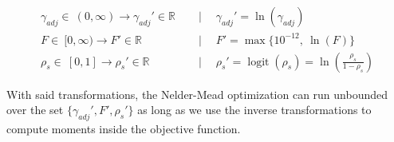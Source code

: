 \begin{equation}
    \begin{aligned}
         \gamma_{adj}\in\ (0, \infty) \to \gamma_{adj}'\in\mathbb{R} &\quad\mid\quad \gamma_{adj}' = \ln(\gamma_{adj}) \\
        F\in\ [0, \infty) \to F'\in\mathbb{R} &\quad\mid\quad F' = \max\{10^{-12},\ \ln(F)\} \\
        \rho_s\in\ [0, 1] \to \rho_s'\in\mathbb{R} &\quad\mid\quad \rho_s' = \operatorname{logit}(\rho_s) = \ln\left(\frac{\rho_s}{1-\rho_s}\right)
    \end{aligned}
\end{equation}

With said transformations, the Nelder-Mead optimization can run unbounded over the set $\{\gamma_{adj}', F', \rho_s'\}$
as long as we use the inverse transformations to compute moments inside the objective function.